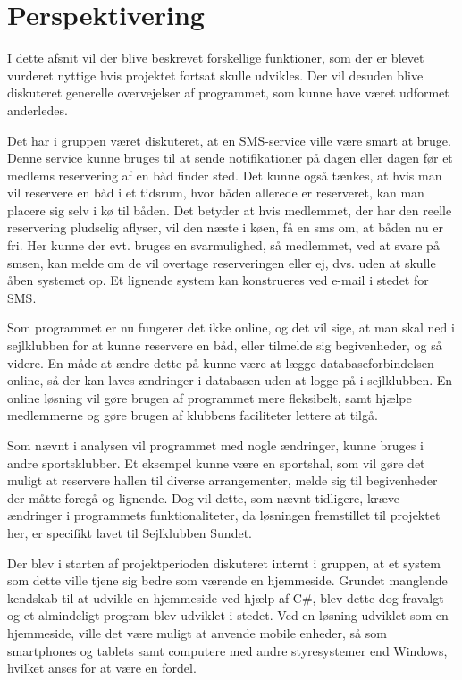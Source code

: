 \chapter{Perspektivering}

I dette afsnit vil der blive beskrevet forskellige funktioner, som der er blevet vurderet nyttige hvis projektet fortsat skulle udvikles. 
Der vil desuden blive diskuteret generelle overvejelser af programmet, som kunne have været udformet anderledes. 

Det har i gruppen været diskuteret, at en SMS-service ville være smart at bruge. 
Denne service kunne bruges til at sende notifikationer på dagen eller dagen før et medlems reservering af en båd finder sted. 
Det kunne også tænkes, at hvis man vil reservere en båd i et tidsrum, hvor båden allerede er reserveret, kan man placere sig selv i kø til båden.
Det betyder at hvis medlemmet, der har den reelle reservering pludselig aflyser, vil den næste i køen, få en sms om, at båden nu er fri.
Her kunne der evt. bruges en svarmulighed, så medlemmet, ved at svare på smsen, kan melde om de vil overtage reserveringen eller ej, dvs. uden at skulle åben systemet op. 
Et lignende system kan konstrueres ved e-mail i stedet for SMS.

Som programmet er nu fungerer det ikke online, og det vil sige, at man skal ned i sejlklubben for at kunne reservere en båd, eller tilmelde sig begivenheder, og så videre. 
En måde at ændre dette på kunne være at lægge databaseforbindelsen online, så der kan laves ændringer i databasen uden at logge på i sejlklubben. 
En online løsning vil gøre brugen af programmet mere fleksibelt, samt hjælpe medlemmerne og gøre brugen af klubbens faciliteter lettere at tilgå.

Som nævnt i analysen vil programmet med nogle ændringer, kunne bruges i andre sportsklubber. 
Et eksempel kunne være en sportshal, som vil gøre det muligt at reservere hallen til diverse arrangementer, melde sig til begivenheder der måtte foregå og lignende. 
Dog vil dette, som nævnt tidligere, kræve ændringer i programmets funktionaliteter, da løsningen fremstillet til projektet her, er specifikt lavet til Sejlklubben Sundet.

Der blev i starten af projektperioden diskuteret internt i gruppen, at et system som dette ville tjene sig bedre som værende en hjemmeside.
Grundet manglende kendskab til at udvikle en hjemmeside ved hjælp af C\#, blev dette dog fravalgt og et almindeligt program blev udviklet i stedet.
Ved en løsning udviklet som en hjemmeside, ville det være muligt at anvende mobile enheder, så som smartphones og tablets samt computere med andre styresystemer end Windows, hvilket anses for at være en fordel.
